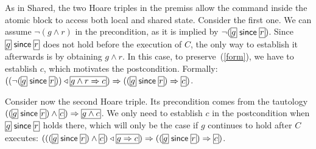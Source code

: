 As in {\sc Shared}, the two Hoare triples in the premiss allow the command
inside the atomic block to access both local and shared state. Consider the
first one.  We can assume $\neg(g \wedge r)$ in the precondition, as it is
implied by $\neg(\shareds{g} \since \shareds{r})$. Since $\shareds{g} \since
\shareds{r}$ does not hold before the execution of $C$, the only way to
establish it afterwards is by obtaining $g \wedge r$. In this case, to
preserve~(\ref{form}), we have to establish $c$, which motivates the
postcondition. Formally: $
((\neg(\shareds{g} \since \shareds{r})) \extend 
\shareds{g \wedge r \Rightarrow c}) \Rightarrow 
((\shareds{g} \since \shareds{r}) \Rightarrow \shareds{c})
$.

Consider now the second Hoare triple. Its
precondition comes from the tautology $((\shareds{g} \since \shareds{r}) \wedge
\shareds{c}) \Rightarrow \shareds{g \wedge c}$. We only need to establish $c$ in
the postcondition when $\shareds{g} \since \shareds{r}$ holds there, which
will only be the case if $g$ continues to hold after $C$ executes:
$
(((\shareds{g} \since \shareds{r}) \wedge \shareds{c}) \extend 
\shareds{g \Rightarrow c}) \Rightarrow 
((\shareds{g} \since \shareds{r}) \Rightarrow \shareds{c})
$.

